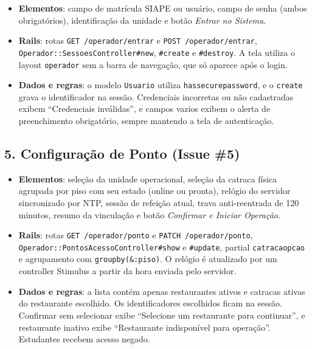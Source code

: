 \documentclass[a4paper,12pt]{article}
\renewcommand{\_}{\textunderscore\allowbreak}
\begin{document}
\begin{itemize}

    \item \textbf{Elementos}: campo de matrícula SIAPE ou usuário, campo de senha (ambos obrigatórios), identificação da unidade e botão \textit{Entrar no Sistema}.

    \item \textbf{Rails}: rotas \texttt{GET /operador/\allowbreak{}entrar} e \texttt{POST /operador/\allowbreak{}entrar}, \texttt{Operador::\allowbreak{}SessoesController\#\allowbreak{}new}, \texttt{\#create} e \texttt{\#destroy}. A tela utiliza o layout \texttt{operador} sem a barra de navegação, que só aparece após o login.

    \item \textbf{Dados e regras}: o modelo \texttt{Usuario} utiliza \texttt{has\_secure\_password}, e o \texttt{create} grava o identificador na sessão. Credenciais incorretas ou não cadastradas exibem ``Credenciais inválidas'', e campos vazios exibem o alerta de preenchimento obrigatório, sempre mantendo a tela de autenticação.

\end{itemize}

\subsection*{5. Configuração de Ponto (Issue \#5)}

\begin{itemize}

    \item \textbf{Elementos}: seleção da unidade operacional, seleção da catraca física agrupada por piso com seu estado (online ou pronta), relógio do servidor sincronizado por NTP, sessão de refeição atual, trava anti-reentrada de 120 minutos, resumo da vinculação e botão \textit{Confirmar e Iniciar Operação}.

    \item \textbf{Rails}: rotas \texttt{GET /operador/\allowbreak{}ponto} e \texttt{PATCH /operador/\allowbreak{}ponto}, \texttt{Operador::\allowbreak{}PontosAcessoController\#\allowbreak{}show} e \texttt{\#update}, partial \texttt{\_catraca\_opcao} e agrupamento com \texttt{group\_by(\&:piso)}. O relógio é atualizado por um controller Stimulus a partir da hora enviada pelo servidor.

    \item \textbf{Dados e regras}: a lista contém apenas restaurantes ativos e catracas ativas do restaurante escolhido. Os identificadores escolhidos ficam na sessão. Confirmar sem selecionar exibe ``Selecione um restaurante para continuar'', e restaurante inativo exibe ``Restaurante indisponível para operação''. Estudantes recebem acesso negado.

\end{itemize}
\end{document}
